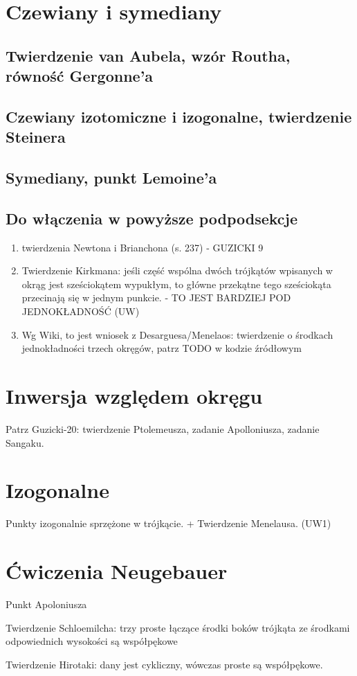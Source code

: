 \section{Czewiany i symediany}
\subsection{Twierdzenie van Aubela, wzór Routha, równość Gergonne'a}
\subsection{Czewiany izotomiczne i izogonalne, twierdzenie Steinera}
\subsection{Symediany, punkt Lemoine'a}


\subsection{Do włączenia w powyższe podpodsekcje}
\begin{enumerate}
    \item twierdzenia Newtona i Brianchona (s. 237) - GUZICKI 9
    \item Twierdzenie Kirkmana: jeśli część wspólna dwóch trójkątów wpisanych w okrąg jest sześciokątem wypukłym, to główne przekątne tego sześciokąta przecinają się w jednym punkcie. - TO JEST BARDZIEJ POD JEDNOKŁADNOŚĆ (UW)
    \item Wg Wiki, to jest wniosek z Desarguesa/Menelaos: twierdzenie o środkach jednokładności trzech okręgów, patrz TODO w kodzie źródłowym %
\end{enumerate}

\section{Inwersja względem okręgu}
Patrz Guzicki-20: twierdzenie Ptolemeusza, zadanie Apolloniusza, zadanie Sangaku.


\section{Izogonalne}
Punkty izogonalnie sprzężone w trójkącie. + Twierdzenie Menelausa. (UW1)

\section{Ćwiczenia Neugebauer}
Punkt Apoloniusza

Twierdzenie Schloemilcha: trzy proste łączące środki boków trójkąta ze środkami odpowiednich wysokości są współpękowe %

Twierdzenie Hirotaki: dany jest cykliczny, wówczas proste są współpękowe.
